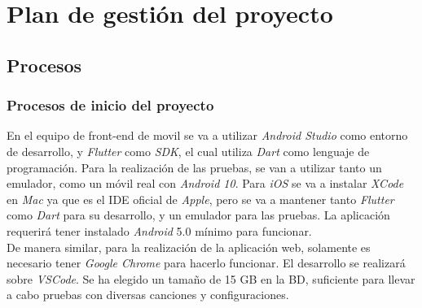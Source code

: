 \documentclass{article}
\begin{document}
\section{Plan de gestión del proyecto}

\subsection{Procesos}

\subsubsection{Procesos de inicio del proyecto}
En el equipo de front-end de movil se va a utilizar \textit{Android Studio} como entorno de desarrollo, y \textit{Flutter} como \textit{SDK}, el cual utiliza \textit{Dart} como lenguaje de programación. Para la realización de las pruebas, se van a utilizar tanto un emulador, como un móvil real con \textit{Android 10}. Para \textit{iOS} se va a instalar \textit{XCode} en \textit{Mac} ya que es el IDE oficial de \textit{Apple}, pero se va a mantener tanto \textit{Flutter} como \textit{Dart} para su desarrollo, y un emulador para las pruebas. La aplicación requerirá tener instalado \textit{Android} 5.0 mínimo para funcionar.\\
\hfill \break
De manera similar, para la realización de la aplicación web, solamente es necesario tener \textit{Google Chrome} para hacerlo funcionar. El desarrollo se realizará sobre \textit{VSCode}.
\hfill \break
Se ha elegido un tamaño de 15 GB en la BD, suficiente para llevar a cabo pruebas con diversas canciones y configuraciones.
\end{document}
